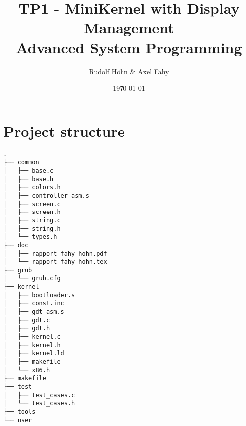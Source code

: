 \documentclass[a4paper]{article}
\title{TP1 - MiniKernel with Display Management\\Advanced System Programming}
\author{Rudolf Höhn \& Axel Fahy}
\date{\today}
\begin{document}
\maketitle

\section{Project structure}
\begin{verbatim}
.
├── common
│   ├── base.c
│   ├── base.h
│   ├── colors.h
│   ├── controller_asm.s
│   ├── screen.c
│   ├── screen.h
│   ├── string.c
│   ├── string.h
│   └── types.h
├── doc
│   ├── rapport_fahy_hohn.pdf
│   └── rapport_fahy_hohn.tex
├── grub
│   └── grub.cfg
├── kernel
│   ├── bootloader.s
│   ├── const.inc
│   ├── gdt_asm.s
│   ├── gdt.c
│   ├── gdt.h
│   ├── kernel.c
│   ├── kernel.h
│   ├── kernel.ld
│   ├── makefile
│   └── x86.h
├── makefile
├── test
│   ├── test_cases.c
│   └── test_cases.h
├── tools
└── user

\end{verbatim}
\end{document}
